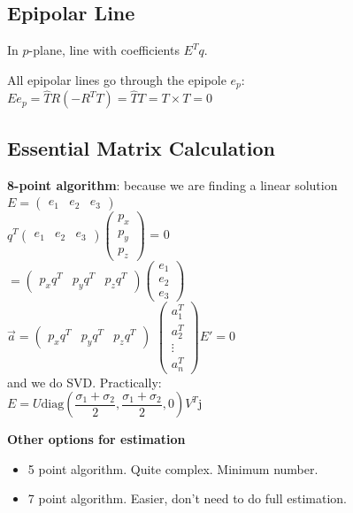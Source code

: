 \subsection*{Epipolar Line}
In $p$-plane, line with coefficients $E^T q$.

All epipolar lines go through the epipole $e_p$:\\
$E e_p = \hat{T} R (-R^T T) = \hat{T}T = T \times T = 0$

\subsection*{Essential Matrix Calculation}
\textbf{8-point algorithm}: because we are finding a linear solution\\
$E = \begin{pmatrix}e_1 & e_2 & e_3 \end{pmatrix}$\\
$q^T \begin{pmatrix}e_1 & e_2 & e_3 \end{pmatrix}
\begin{pmatrix}p_x \\ p_y \\ p_z \end{pmatrix}$ = 0\\
$= \begin{pmatrix}p_x q^T & p_y q^T&p_z q^T \end{pmatrix}
\begin{pmatrix}e_1 \\ e_2 \\ e_3 \end{pmatrix}$\\
$\vec{a} = \begin{pmatrix}p_x q^T & p_y q^T&p_z q^T \end{pmatrix}$
$\begin{pmatrix} a_1^T \\ a_2^T \\ \vdots \\ a_n^T \end{pmatrix} E' =
0$\\
and we do SVD. Practically: \\
$E = U \text{diag}\left(\dfrac{\sigma_1 + \sigma_2}{2}, \dfrac{\sigma_1
+ \sigma_2}{2}, 0 \right) V^T$j

\textbf{Other options for estimation}
\begin{itemize}
  \item 5 point algorithm. Quite complex. Minimum number.
  \item 7 point algorithm. Easier, don't need to do full estimation.
\end{itemize}

